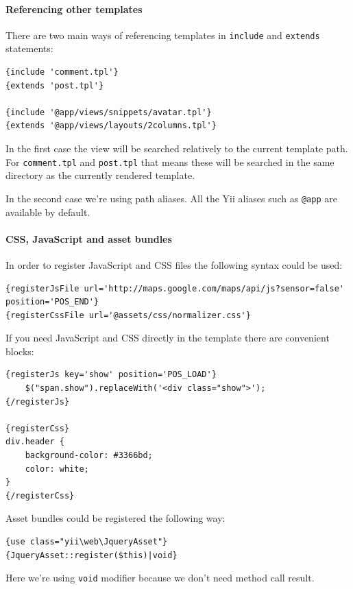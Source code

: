 \paragraph{Referencing other templates}
There are two main ways of referencing templates in \lstinline|include| and \lstinline|extends| statements:

\begin{lstlisting}
{include 'comment.tpl'}
{extends 'post.tpl'}

{include '@app/views/snippets/avatar.tpl'}
{extends '@app/views/layouts/2columns.tpl'}
\end{lstlisting}
In the first case the view will be searched relatively to the current template path. For \lstinline|comment.tpl| and \lstinline|post.tpl|
that means these will be searched in the same directory as the currently rendered template.

In the second case we're using path aliases. All the Yii aliases such as \lstinline|@app| are available by default.

\paragraph{CSS, JavaScript and asset bundles}
In order to register JavaScript and CSS files the following syntax could be used:

\begin{lstlisting}
{registerJsFile url='http://maps.google.com/maps/api/js?sensor=false' position='POS_END'}
{registerCssFile url='@assets/css/normalizer.css'}
\end{lstlisting}
If you need JavaScript and CSS directly in the template there are convenient blocks:

\begin{lstlisting}
{registerJs key='show' position='POS_LOAD'}
    $("span.show").replaceWith('<div class="show">');
{/registerJs}

{registerCss}
div.header {
    background-color: #3366bd;
    color: white;
}
{/registerCss}
\end{lstlisting}
Asset bundles could be registered the following way:

\begin{lstlisting}
{use class="yii\web\JqueryAsset"}
{JqueryAsset::register($this)|void}
\end{lstlisting}
Here we're using \lstinline|void| modifier because we don't need method call result.

